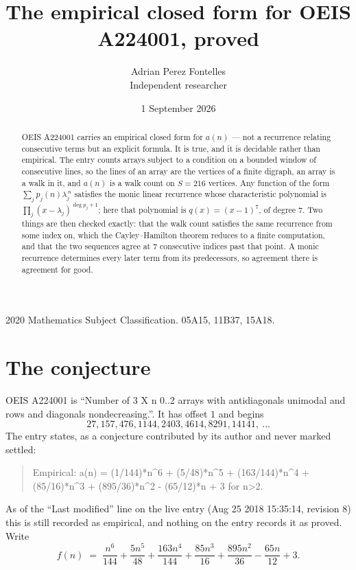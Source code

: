 \documentclass[11pt,a4paper]{article}
\title{The empirical closed form for OEIS A224001, proved}
\author{Adrian Perez Fontelles\\ \small Independent researcher}
\date{1 September 2026}
\theoremstyle{plain}
\theoremstyle{definition}
\begin{document}
\maketitle

\begin{abstract}
OEIS A224001 carries an empirical closed form for $a(n)$ --- not a recurrence relating
consecutive terms but an explicit formula. It is true, and it is decidable rather than
empirical. The entry counts arrays subject to a condition on a bounded window of consecutive lines, so the lines of an array are the
vertices of a finite digraph, an array is a walk in it, and $a(n)$ is a walk count on
$S=216$ vertices. Any function of the form $\sum_j p_j(n)\lambda_j^{\,n}$ satisfies the
monic linear recurrence whose characteristic polynomial is
$\prod_j(x-\lambda_j)^{\deg p_j+1}$; here that polynomial is $q(x)=(x-1)^{7}$, of degree
$7$. Two things are then checked exactly: that the walk count satisfies the same
recurrence from some index on, which the Cayley--Hamilton theorem reduces to a finite
computation, and that the two sequences agree at $7$ consecutive indices past that
point. A monic recurrence determines every later term from its predecessors, so agreement
there is agreement for good.
\end{abstract}

\noindent\small 2020 Mathematics Subject Classification. 05A15, 11B37, 15A18.\normalsize

\section{The conjecture}

OEIS A224001 is ``Number of 3 X n 0..2 arrays with antidiagonals unimodal and rows and diagonals nondecreasing.''. It has offset $1$ and begins
\[
27, 157, 476, 1144, 2403, 4614, 8291, 14141,\ \dots
\]
The entry states, as a conjecture contributed by its author and never marked settled:
\begin{quote}
Empirical: a(n) = (1/144)*n\^{}6 + (5/48)*n\^{}5 + (163/144)*n\^{}4 + (85/16)*n\^{}3 + (895/36)*n\^{}2 - (65/12)*n + 3 for n>2.
\end{quote}
As of the ``Last modified'' line on the live entry (Aug 25 2018 15:35:14, revision 8) this is still
recorded as empirical, and nothing on the entry records it as proved. Write
\[
f(n)\;=\;\frac{n^{6}}{144} + \frac{5 n^{5}}{48} + \frac{163 n^{4}}{144} + \frac{85 n^{3}}{16} + \frac{895 n^{2}}{36} - \frac{65 n}{12} + 3.
\]
\end{document}
